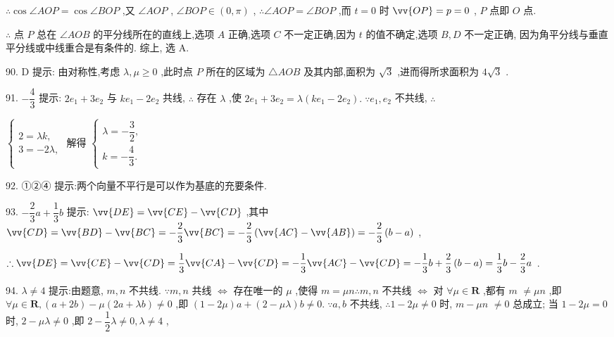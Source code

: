 $\therefore \cos \angle {AOP} = \cos \angle {BOP}$ ,又 $\angle {AOP}$ , $\angle {BOP} \in  \left( {0,\pi }\right)$ , $\therefore \angle {AOP} = \angle {BOP}$ ,而 $t = 0$ 时 $\vv{OP} = p = 0$ , $P$ 点即 $O$ 点.

$\therefore$ 点 $P$ 总在 $\angle {AOB}$ 的平分线所在的直线上,选项 $A$ 正确,选项 $C$ 不一定正确,因为 $t$ 的值不确定,选项 $B,D$ 不一定正确, 因为角平分线与垂直平分线或中线重合是有条件的. 综上, 选 A.

90. D 提示: 由对称性,考虑 $\lambda ,\mu  \geq  0$ ,此时点 $P$ 所在的区域为 $\bigtriangleup {AOB}$ 及其内部,面积为 $\sqrt{3}$ ,进而得所求面积为 $4\sqrt{3}$ .

91. $- \dfrac{4}{3}$ 提示: $2{e}_{1} + 3{e}_{2}$ 与 $k{e}_{1} - 2{e}_{2}$ 共线, $\therefore$ 存在 $\lambda$ ,使 $2{e}_{1} + 3{e}_{2} = \lambda \left( {k{e}_{1} - 2{e}_{2}}\right) .\;\because {e}_{1},{e}_{2}$ 不共线, $\therefore$

$\left\{  {\begin{array}{l} 2 = {\lambda k}, \\  3 =  - {2\lambda }, \end{array}\text{ 解得 }\left\{  \begin{array}{l} \lambda  =  - \dfrac{3}{2}, \\  k =  - \dfrac{4}{3}. \end{array}\right. }\right.$

92. ①②④ 提示:两个向量不平行是可以作为基底的充要条件.

93. $- \dfrac{2}{3}a + \dfrac{1}{3}b$ 提示: $\vv{DE} = \vv{CE} - \vv{CD}$ ,其中 $\vv{CD} = \vv{BD} - \vv{BC} =  - \dfrac{2}{3}\vv{BC} =  - \dfrac{2}{3}\left( {\vv{AC} - \vv{AB}}\right)  =  - \dfrac{2}{3}\left( {b - a}\right)$ ,

$\therefore \vv{DE} = \vv{CE} - \vv{CD} = \dfrac{1}{3}\vv{CA} - \vv{CD} =  - \dfrac{1}{3}\vv{AC} - \vv{CD} =  - \dfrac{1}{3}b + \dfrac{2}{3}\left( {b - a}\right)  = \dfrac{1}{3}b - \dfrac{2}{3}a$ .

94. $\lambda  \neq  4$ 提示:由题意, $m,n$ 不共线. $\because m,n$ 共线 $\Leftrightarrow$ 存在唯一的 $\mu$ ,使得 $m = {\mu n}\therefore m,n$ 不共线 $\Leftrightarrow$ 对 $\forall \mu  \in  \mathbf{R}$ ,都有 $m$  $\neq  {\mu n}$ ,即 $\forall \mu  \in  \mathbf{R},\left( {a + {2b}}\right)  - \mu \left( {{2a} + {\lambda b}}\right)  \neq  0$ ,即 $\left( {1 - {2\mu }}\right) a + \left( {2 - {\mu \lambda }}\right) b \neq  0.\;\because a,b$ 不共线, $\therefore 1 - {2\mu } \neq  0$ 时, $m - {\mu n}$  $\neq  0$ 总成立; 当 $1 - {2\mu } = 0$ 时, $2 - {\mu \lambda } \neq  0$ ,即 $2 - \dfrac{1}{2}\lambda  \neq  0,\lambda  \neq  4$ ,

